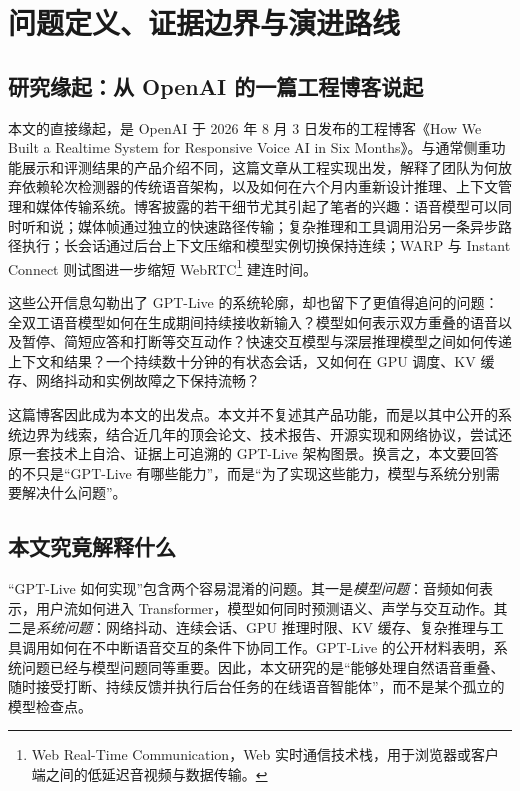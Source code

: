\section{问题定义、证据边界与演进路线}

\subsection{研究缘起：从 OpenAI 的一篇工程博客说起}

本文的直接缘起，是 OpenAI 于 2026 年 8 月 3 日发布的工程博客《How We Built a Realtime System for Responsive Voice AI in Six Months》\cite{openai2026continuous}。与通常侧重功能展示和评测结果的产品介绍不同，这篇文章从工程实现出发，解释了团队为何放弃依赖轮次检测器的传统语音架构，以及如何在六个月内重新设计推理、上下文管理和媒体传输系统。博客披露的若干细节尤其引起了笔者的兴趣：语音模型可以同时听和说；媒体帧通过独立的快速路径传输；复杂推理和工具调用沿另一条异步路径执行；长会话通过后台上下文压缩和模型实例切换保持连续；WARP 与 Instant Connect 则试图进一步缩短 WebRTC\footnote{Web Real-Time Communication，Web 实时通信技术栈，用于浏览器或客户端之间的低延迟音视频与数据传输。} 建连时间。

这些公开信息勾勒出了 GPT-Live 的系统轮廓，却也留下了更值得追问的问题：全双工语音模型如何在生成期间持续接收新输入？模型如何表示双方重叠的语音以及暂停、简短应答和打断等交互动作？快速交互模型与深层推理模型之间如何传递上下文和结果？一个持续数十分钟的有状态会话，又如何在 GPU 调度、KV 缓存、网络抖动和实例故障之下保持流畅？

这篇博客因此成为本文的出发点。本文并不复述其产品功能，而是以其中公开的系统边界为线索，结合近几年的顶会论文、技术报告、开源实现和网络协议，尝试还原一套技术上自洽、证据上可追溯的 GPT-Live 架构图景。换言之，本文要回答的不只是“GPT-Live 有哪些能力”，而是“为了实现这些能力，模型与系统分别需要解决什么问题”。

\subsection{本文究竟解释什么}

“GPT-Live 如何实现”包含两个容易混淆的问题。其一是\emph{模型问题}：音频如何表示，用户流如何进入 Transformer，模型如何同时预测语义、声学与交互动作。其二是\emph{系统问题}：网络抖动、连续会话、GPU 推理时限、KV 缓存、复杂推理与工具调用如何在不中断语音交互的条件下协同工作。GPT-Live 的公开材料表明，系统问题已经与模型问题同等重要\cite{openai2026gptlive,openai2026continuous}。因此，本文研究的是“能够处理自然语音重叠、随时接受打断、持续反馈并执行后台任务的在线语音智能体”，而不是某个孤立的模型检查点。

